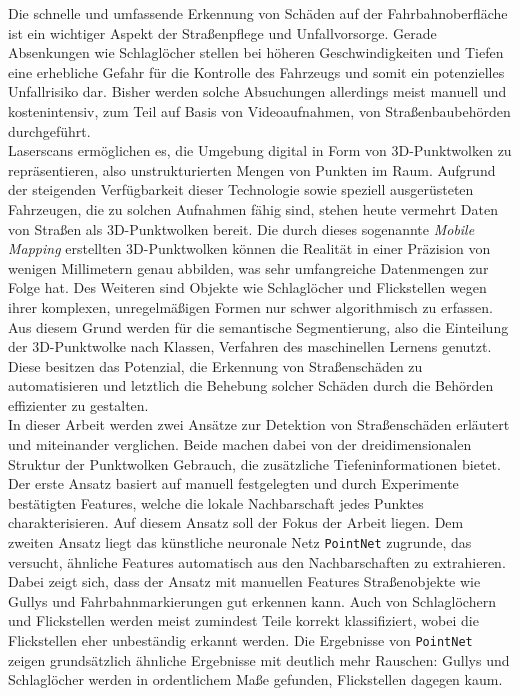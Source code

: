 

Die schnelle und umfassende Erkennung von Schäden auf der Fahrbahnoberfläche ist ein wichtiger Aspekt der Straßenpflege und Unfallvorsorge. Gerade Absenkungen wie Schlaglöcher stellen bei höheren Geschwindigkeiten und Tiefen eine erhebliche Gefahr für die Kontrolle des Fahrzeugs und somit ein potenzielles Unfallrisiko dar. Bisher werden solche Absuchungen allerdings meist manuell und kostenintensiv, zum Teil auf Basis von Videoaufnahmen, von Straßenbaubehörden durchgeführt. \\
Laserscans ermöglichen es, die Umgebung digital in Form von 3D-Punktwolken zu repräsentieren, also unstrukturierten Mengen von Punkten im Raum. Aufgrund der steigenden Verfügbarkeit dieser Technologie sowie speziell ausgerüsteten Fahrzeugen, die zu solchen Aufnahmen fähig sind, stehen heute vermehrt Daten von Straßen als 3D-Punktwolken bereit. Die durch dieses sogenannte \textit{Mobile Mapping} erstellten 3D-Punktwolken können die Realität in einer Präzision von wenigen Millimetern genau abbilden, was sehr umfangreiche Datenmengen zur Folge hat. Des Weiteren sind Objekte wie Schlaglöcher und Flickstellen wegen ihrer komplexen, unregelmäßigen Formen nur schwer algorithmisch zu erfassen. Aus diesem Grund werden für die semantische Segmentierung, also die Einteilung der 3D-Punktwolke nach Klassen, Verfahren des maschinellen Lernens genutzt. Diese besitzen das Potenzial, die Erkennung von Straßenschäden zu automatisieren und letztlich die Behebung solcher Schäden durch die Behörden effizienter zu gestalten. \\
In dieser Arbeit werden zwei Ansätze zur Detektion von Straßenschäden erläutert und miteinander verglichen. Beide machen dabei von der dreidimensionalen Struktur der Punktwolken Gebrauch, die zusätzliche Tiefeninformationen bietet. Der erste Ansatz basiert auf manuell festgelegten und durch Experimente bestätigten Features, welche die lokale Nachbarschaft jedes Punktes charakterisieren. Auf diesem Ansatz soll der Fokus der Arbeit liegen. Dem zweiten Ansatz liegt das künstliche neuronale Netz \texttt{PointNet} zugrunde, das versucht, ähnliche Features automatisch aus den Nachbarschaften zu extrahieren. \\
Dabei zeigt sich, dass der Ansatz mit manuellen Features Straßenobjekte wie Gullys und Fahrbahnmarkierungen gut erkennen kann. Auch von Schlaglöchern und Flickstellen werden meist zumindest Teile korrekt klassifiziert, wobei die Flickstellen eher unbeständig erkannt werden. Die Ergebnisse von \texttt{PointNet} zeigen grundsätzlich ähnliche Ergebnisse mit deutlich mehr Rauschen: Gullys und Schlaglöcher werden in ordentlichem Maße gefunden, Flickstellen dagegen kaum.

\cleardoublepage
